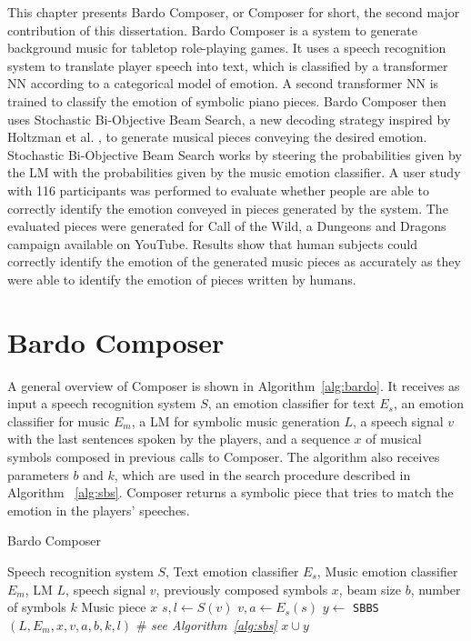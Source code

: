 This chapter presents Bardo Composer, or Composer for short, the second major contribution of this dissertation. Bardo Composer is a system to generate background music for tabletop role-playing games. It uses a speech recognition system to translate player speech into text, which is classified by a transformer NN according to a categorical model of emotion. A second transformer NN is trained to classify the emotion of symbolic piano pieces. Bardo Composer then uses Stochastic Bi-Objective Beam Search, a new decoding strategy inspired by Holtzman et al. \cite{holtzman2018learning}, to generate musical pieces conveying the desired emotion. Stochastic Bi-Objective Beam Search works by steering the probabilities given by the LM with the probabilities given by the music emotion classifier. A user study with 116 participants was performed to evaluate whether people are able to correctly identify the emotion conveyed in pieces generated by the system. The evaluated pieces were generated for Call of the Wild, a Dungeons and Dragons campaign available on YouTube. Results show that human subjects could correctly identify the emotion of the generated music pieces as accurately as they were able to identify the emotion of pieces written by humans.

\section{Bardo Composer}

A general overview of Composer is shown in Algorithm~\ref{alg:bardo}. It receives as input a speech recognition system $S$, an emotion classifier for text $E_s$, an emotion classifier for music $E_m$, a LM for symbolic music generation $L$, a speech signal $v$ with the last sentences spoken by the players, and a sequence $x$ of musical symbols composed in previous calls to Composer. The algorithm also receives parameters $b$ and $k$, which are used in the search procedure described in Algorithm ~\ref{alg:sbs}. Composer returns a symbolic piece that tries to match the emotion in the players' speeches.

\begin{algorithm}[t]
\caption{Bardo Composer}
\label{alg:bardo}
\begin{algorithmic}[1]
\REQUIRE Speech recognition system $S$, Text emotion classifier $E_s$, Music emotion classifier $E_m$, LM $L$, speech signal $v$, previously composed symbols $x$, beam size $b$, number of symbols $k$
\ENSURE Music piece $x$
\STATE $s, l \gets S(v)$ \label{line:voice2text}
\STATE $v, a \gets E_s(s)$ \label{line:emotion_classification}
\STATE $y \gets$ \texttt{SBBS}$(L, E_m, x, v, a, b, k, l)$ \# \emph{see Algorithm~\ref{alg:sbs}} \label{line:sbs}
\RETURN $x \cup y$ \label{line:generation2}
\end{algorithmic}
\end{algorithm}


